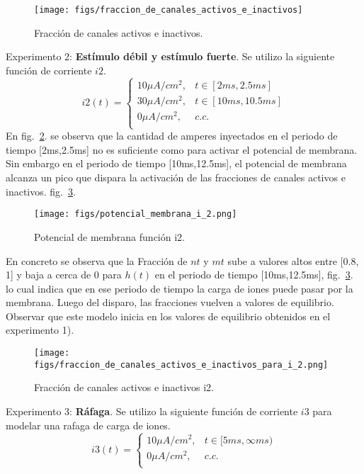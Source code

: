 \documentclass[aps,prl,twocolumn,groupedaddress]{revtex4-2}
\begin{document}
\begin{figure}[h!]
\centering
\texttt{[image: figs/fraccion\_de\_canales\_activos\_e\_inactivos]}
\caption{Fracción de canales activos e inactivos. \label{fig2}}
\end{figure}


Experimento 2: \textbf{Estímulo débil y estímulo fuerte}. Se utilizo la siguiente función de corriente $i2$.
$$
i2(t) = \left\{
\begin{array}{ll}
10 \mu A/cm^2, & t\in [2ms,2.5ms] \\
30 \mu A/cm^2, & t\in [10ms,10.5ms] \\
0 \mu A/cm^2, & c.c. \\
\end{array}
\right.
$$
En fig.~\ref{fig3}. se observa  que la cantidad de amperes inyectados en el periodo de tiempo [2ms,2.5ms]  no es suficiente como para activar el potencial de membrana. Sin embargo en el periodo de tiempo [10ms,12.5ms], el potencial de membrana alcanza un pico que  dispara la activación de las fracciones de canales activos e inactivos.  fig.~\ref{fig4}. 

\begin{figure}[h!]
\centering
\texttt{[image: figs/potencial\_membrana\_i\_2.png]}
\caption{Potencial de membrana función i2. \label{fig3}}
\end{figure}

En concreto se observa que la Fracción de $nt$ y $mt$ sube a valores altos entre [0.8, 1] y baja a cerca de  0 para $h(t)$ en el periodo de tiempo [10ms,12.5ms], 
fig.~\ref{fig4}. lo cual indica que en ese periodo de tiempo la carga de iones puede pasar por la membrana.
Luego del disparo, las fracciones vuelven a valores de equilibrio.
Observar que este modelo inicia en los valores de equilibrio obtenidos en el experimento 1).\newline


\begin{figure}[h!]
\centering
\texttt{[image: figs/fraccion\_de\_canales\_activos\_e\_inactivos\_para\_i\_2.png]}
\caption{Fracción de canales activos e inactivos i2. \label{fig4}}
\end{figure}

Experimento 3: \textbf{Ráfaga}. Se utilizo la siguiente función de corriente $i3$ para modelar una rafaga de carga de iones.
$$
i3(t) = \left\{
\begin{array}{ll}
10 \mu A/cm^2, & t\in [5ms,\infty ms) \\
0 \mu A/cm^2, & c.c. \\
\end{array}
\right.
$$
\end{document}
